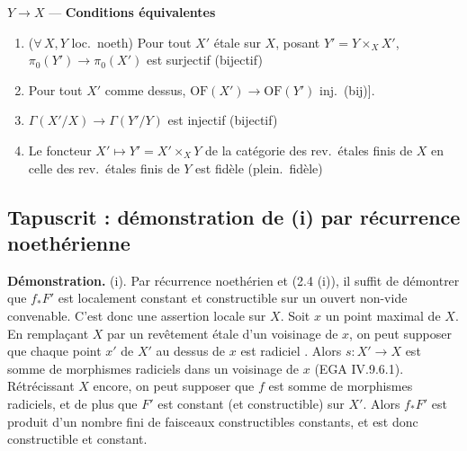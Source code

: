 \documentclass[11pt,a4paper]{article}
\begin{document}
$Y \to X$ — \textbf{Conditions équivalentes}
\begin{enumerate}
  \item[(i bis)] ($\forall\, X, Y$ loc.\ noeth) Pour tout $X'$ 
    étale sur $X$, posant $Y' = Y \times_X X'$, \struck{\ill{}}
    $\pi_0(Y') \to \pi_0(X')$ est surjectif (bijectif)
  \item[(i)] Pour tout $X'$ comme dessus, $\mathrm{OF}(X') \to \mathrm{OF}(Y')$
    inj.\ (bij)].
  \item[(ii)] $\Gamma(X'/X) \to \Gamma(Y'/Y)$ est injectif (bijectif)
  \item[(iii)] Le foncteur $X' \mapsto Y' = X' \times_X Y$ de la catégorie
    des rev.\ étales finis de $X$ en celle des rev.\ étales finis de $Y$ est
    fidèle (plein.\ fidèle)
\end{enumerate}

\subsection{Tapuscrit : démonstration de (i) par récurrence noethérienne}

\textbf{Démonstration.} (i). Par récurrence noethérien et (2.4 (i)),
il suffit de démontrer que $f_* F'$ est localement constant et
constructible sur un ouvert non-vide convenable.
C'est donc une assertion locale sur $X$. Soit $x$ un point maximal de $X$.
En remplaçant $X$ par un revêtement étale d'un voisinage de $x$, on peut
supposer que chaque point $x'$ de $X'$ au dessus de $x$ est radiciel
.  Alors $s : X' \to X$ est somme de
morphismes radiciels dans un voisinage de $x$ (EGA IV.9.6.1).
Rétrécissant  $X$ encore, on peut supposer que $f$ est
somme de morphismes radiciels, et de plus que $F'$ est constant (et
constructible) sur $X'$. Alors $f_* F'$ est produit d'un nombre fini de
faisceaux constructibles constants, et est donc constructible et constant.
\end{document}
